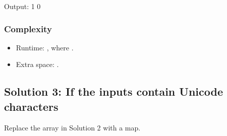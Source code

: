 \documentclass[letterpaper,12pt,english]{book}
\begin{document}
\begin{sphinxVerbatim}[commandchars=\\\{\}]
\end{sphinxVerbatim}

\begin{sphinxVerbatim}[commandchars=\\\{\}]
Output:
1
0
\end{sphinxVerbatim}


\subsubsection{Complexity}
\label{\detokenize{String/08_STR_242_Valid_Anagram:id2}}\begin{itemize}
\item {} 
\sphinxAtStartPar
Runtime: , where .

\item {} 
\sphinxAtStartPar
Extra space: .

\end{itemize}


\subsection{Solution 3: If the inputs contain Unicode characters}
\label{\detokenize{String/08_STR_242_Valid_Anagram:solution-3-if-the-inputs-contain-unicode-characters}}
\sphinxAtStartPar
Replace the array  in Solution 2 with a map.
\end{document}

